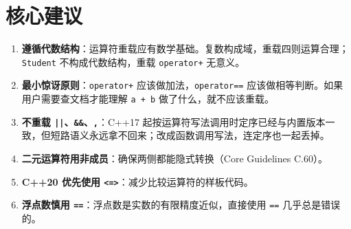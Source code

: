 \documentclass[12pt,a4paper,fontset=fandol]{ctexbook}
\newcommand{\cpp}[1]{C++#1}
\newcommand{\Tp}[1]{\texttt{#1}}
\newcommand{\Op}[1]{\texttt{operator#1}}
\begin{document}
\section{核心建议}

\begin{guideline}
\begin{enumerate}
  \item \textbf{遵循代数结构}：运算符重载应有数学基础。复数构成域，重载四则运算合理；\Tp{Student} 不构成代数结构，重载 \Op{+} 无意义。
  \item \textbf{最小惊讶原则}：\Op{+} 应该做加法，\Op{==} 应该做相等判断。如果用户需要查文档才能理解 \texttt{a + b} 做了什么，就不应该重载。
  \item \textbf{不重载 \texttt{||}、\texttt{\&\&}、\texttt{,}}：\cpp{17} 起按运算符写法调用时定序已经与内置版本一致，但短路语义永远拿不回来；改成函数调用写法，连定序也一起丢掉。
  \item \textbf{二元运算符用非成员}：确保两侧都能隐式转换（Core Guidelines C.60）。
  \item \textbf{\cpp{20} 优先使用 \texttt{<=>}}：减少比较运算符的样板代码。
  \item \textbf{浮点数慎用 \texttt{==}}：浮点数是实数的有限精度近似，直接使用 \texttt{==} 几乎总是错误的。
\end{enumerate}
\end{guideline}
\end{document}
